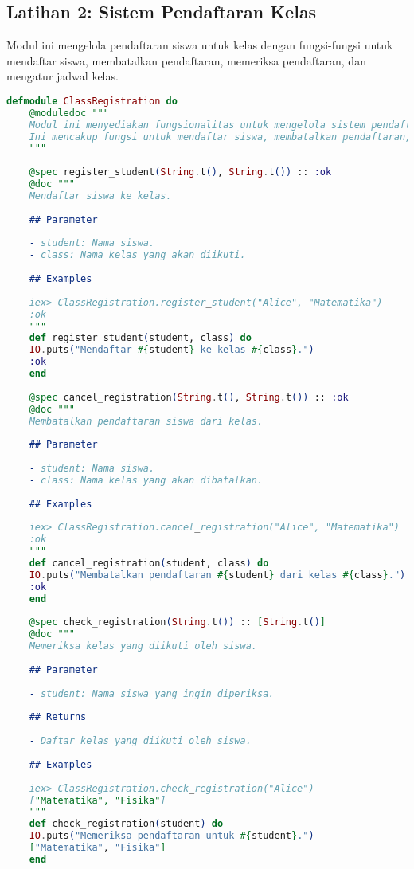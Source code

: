 \subsection{Latihan 2: Sistem Pendaftaran Kelas}

Modul ini mengelola pendaftaran siswa untuk kelas dengan fungsi-fungsi untuk mendaftar siswa, membatalkan pendaftaran, memeriksa pendaftaran, dan mengatur jadwal kelas.

\begin{lstlisting}[language=Elixir, caption={Modul Pendaftaran Kelas}]
	defmodule ClassRegistration do
	@moduledoc """
	Modul ini menyediakan fungsionalitas untuk mengelola sistem pendaftaran kelas.
	Ini mencakup fungsi untuk mendaftar siswa, membatalkan pendaftaran, memeriksa pendaftaran, dan mengatur jadwal kelas.
	"""
	
	@spec register_student(String.t(), String.t()) :: :ok
	@doc """
	Mendaftar siswa ke kelas.
	
	## Parameter
	
	- student: Nama siswa.
	- class: Nama kelas yang akan diikuti.
	
	## Examples
	
	iex> ClassRegistration.register_student("Alice", "Matematika")
	:ok
	"""
	def register_student(student, class) do
	IO.puts("Mendaftar #{student} ke kelas #{class}.")
	:ok
	end
	
	@spec cancel_registration(String.t(), String.t()) :: :ok
	@doc """
	Membatalkan pendaftaran siswa dari kelas.
	
	## Parameter
	
	- student: Nama siswa.
	- class: Nama kelas yang akan dibatalkan.
	
	## Examples
	
	iex> ClassRegistration.cancel_registration("Alice", "Matematika")
	:ok
	"""
	def cancel_registration(student, class) do
	IO.puts("Membatalkan pendaftaran #{student} dari kelas #{class}.")
	:ok
	end
	
	@spec check_registration(String.t()) :: [String.t()]
	@doc """
	Memeriksa kelas yang diikuti oleh siswa.
	
	## Parameter
	
	- student: Nama siswa yang ingin diperiksa.
	
	## Returns
	
	- Daftar kelas yang diikuti oleh siswa.
	
	## Examples
	
	iex> ClassRegistration.check_registration("Alice")
	["Matematika", "Fisika"]
	"""
	def check_registration(student) do
	IO.puts("Memeriksa pendaftaran untuk #{student}.")
	["Matematika", "Fisika"]
	end
	

\end{lstlisting}
